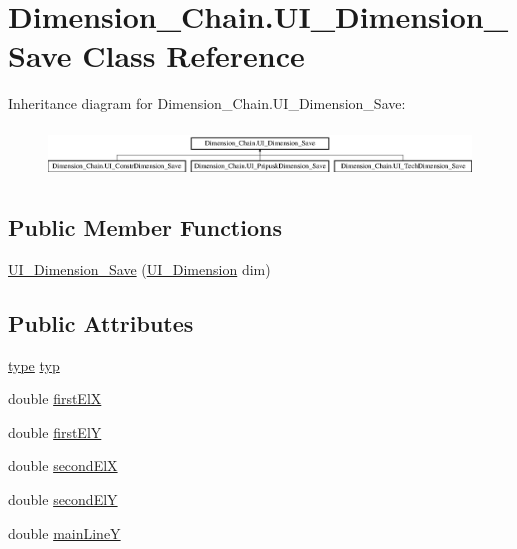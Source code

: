 \hypertarget{class_dimension___chain_1_1_u_i___dimension___save}{}\section{Dimension\+\_\+\+Chain.\+U\+I\+\_\+\+Dimension\+\_\+\+Save Class Reference}
\label{class_dimension___chain_1_1_u_i___dimension___save}
Inheritance diagram for Dimension\+\_\+\+Chain.\+U\+I\+\_\+\+Dimension\+\_\+\+Save\+:\begin{figure}[H]
\begin{center}
\leavevmode
\includegraphics[height=1.352657cm]{class_dimension___chain_1_1_u_i___dimension___save}
\end{center}
\end{figure}
\subsection*{Public Member Functions}
\begin{DoxyCompactItemize}
\item 
\mbox{\hyperlink{class_dimension___chain_1_1_u_i___dimension___save_aae45b10d2ca9f2b9625adf6b1fccb0d4}{U\+I\+\_\+\+Dimension\+\_\+\+Save}} (\mbox{\hyperlink{class_dimension___chain_1_1_u_i___dimension}{U\+I\+\_\+\+Dimension}} dim)
\end{DoxyCompactItemize}
\subsection*{Public Attributes}
\begin{DoxyCompactItemize}
\item 
\mbox{\hyperlink{namespace_dimension___chain_a6ec9051138598c61cc00acf2547dced4}{type}} \mbox{\hyperlink{class_dimension___chain_1_1_u_i___dimension___save_aa786efebf27fc3c4223c35108ffe8876}{typ}}
\item 
double \mbox{\hyperlink{class_dimension___chain_1_1_u_i___dimension___save_ade2ef60cd8d44db6ad2c9be7fa3e40c7}{first\+ElX}}
\item 
double \mbox{\hyperlink{class_dimension___chain_1_1_u_i___dimension___save_a591f5c435d6dd1edc9fe3d91caa888c7}{first\+ElY}}
\item 
double \mbox{\hyperlink{class_dimension___chain_1_1_u_i___dimension___save_a3c51875b880963262a41d8a9e63e1267}{second\+ElX}}
\item 
double \mbox{\hyperlink{class_dimension___chain_1_1_u_i___dimension___save_a28b0b4c78413dd8954d383adc852c034}{second\+ElY}}
\item 
double \mbox{\hyperlink{class_dimension___chain_1_1_u_i___dimension___save_a4d7e3ef8c0639f4c4b10167b94e69d49}{main\+LineY}}
\end{DoxyCompactItemize}


